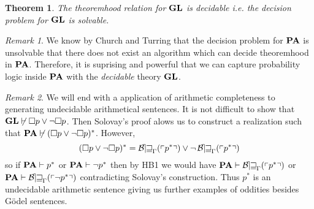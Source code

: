 \documentclass[12pt, leqno]{article}
\newcommand{\proves}{\vdash}
\theoremstyle{theorem}
\newtheorem{theorem}{Theorem}[section]
\theoremstyle{definition}
\theoremstyle{definition}
\theoremstyle{remark}
\theoremstyle{definition}
\theoremstyle{remark}
\newtheorem{remark}{Remark}[subsection]
\begin{document}
\begin{theorem}
The theoremhood relation for $\mathbf{GL}$ is decidable i.e. the decision problem for $\mathbf{GL}$ is solvable. 
\end{theorem}

\begin{remark}
We know by Church and Turring that the decision problem for $\mathbf{PA}$ is unsolvable that there does not exist an algorithm which can decide theoremhood in $\mathbf{PA}$. Therefore, it is suprising and powerful that we can capture probability logic inside $\mathbf{PA}$ with the \textit{decidable} theory $\mathbf{GL}$.
\end{remark}

\begin{remark}
We will end with a application of arithmetic completeness to generating undecidable arithmetical sentences. It is not difficult to show that $\GL \not\proves \square p \vee \neg \square p$. Then Solovay's proof alows us to construct a realization such that $\PA \not\proves (\square p \vee \neg \square p)^*$. However,
\[ (\square p \vee \neg \square p)^* = \operatorname{\mathcal{B\mkern-2.0mu e\mkern-2.0mu w\mkern-1mu}}_{\Gamma}(\left\ulcorner p^* \right\urcorner) \vee \neg \operatorname{\mathcal{B\mkern-2.0mu e\mkern-2.0mu w\mkern-1mu}}_{\Gamma}(\left\ulcorner p^* \right\urcorner) \]
so if $\PA \proves p^*$ or $\PA \proves \neg p^*$ then by HB1 we would have $\PA \proves \Thm{p^*}$ or $\PA \proves \Thm{\neg p^*}$ contradicting Solovay's construction. Thus $p^*$ is an undecidable arithmetic sentence giving us further examples of oddities besides G\"{o}del sentences.
\end{remark}
\end{document}
